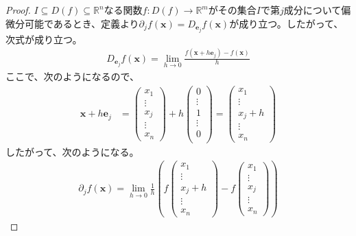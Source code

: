 \documentclass[dvipdfmx]{jsarticle}
\begin{document}
\begin{proof}
$I \subseteq D(f) \subseteq \mathbb{R}^{n}$なる関数$f:D(f) \rightarrow \mathbb{R}^{m}$がその集合$I$で第$j$成分について偏微分可能であるとき、定義より$\partial_{j}f\left( \mathbf{x} \right) = D_{\mathbf{e}_{j}}f\left( \mathbf{x} \right)$が成り立つ。したがって、次式が成り立つ。
\begin{align*}
D_{\mathbf{e}_{j}}f\left( \mathbf{x} \right) = \lim_{h \rightarrow 0}\frac{f\left( \mathbf{x} + h\mathbf{e}_{j} \right) - f\left( \mathbf{x} \right)}{h}
\end{align*}
ここで、次のようになるので、
\begin{align*}
\mathbf{x} + h\mathbf{e}_{j} &= \left( \begin{matrix}
x_{1} \\
\vdots \\
x_{j} \\
\vdots \\
x_{n} 
\end{matrix} \right)+ h\left( \begin{matrix}
0 \\
\vdots \\
1 \\
\vdots \\
0\\
\end{matrix} \right)= \left( \begin{matrix}
x_{1} \\
\vdots \\
x_{j} +h\\
\vdots \\
x_{n} 
\end{matrix} \right)
\end{align*}
したがって、次のようになる。
\begin{align*}
\partial_{j}f\left( \mathbf{x} \right) = \lim_{h \rightarrow 0}\frac{1}{h}\left( f\left( \begin{matrix}
x_{1} \\
\vdots \\
x_{j} + h \\
\vdots \\
x_{n} 
\end{matrix} \right) - f\left( \begin{matrix}
x_{1} \\
\vdots \\
x_{j} \\
\vdots \\
x_{n} 
\end{matrix} \right) \right)\end{align*}
\end{proof}
\end{document}
